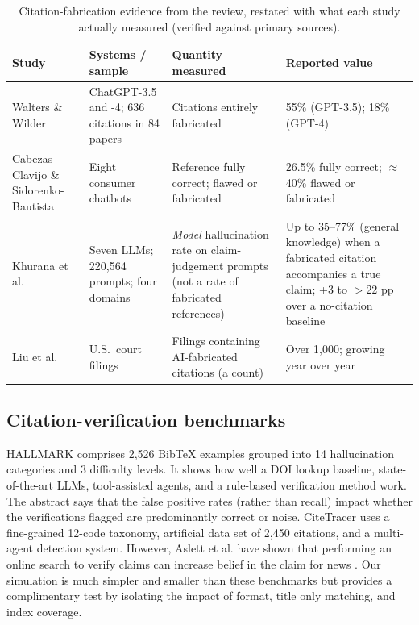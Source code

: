 \begin{table}[t]
\caption{Citation-fabrication evidence from the review, restated with what each study actually measured (verified against primary sources).}
\label{tab:review}
\centering\footnotesize
\begin{tabular}{@{}p{3.1cm}p{4.2cm}p{4.4cm}p{4.8cm}@{}}
\toprule
Study & Systems / sample & Quantity measured & Reported value \\
\midrule
Walters \& Wilder \cite{walters2023} & ChatGPT-3.5 and -4; 636 citations in 84 papers & Citations entirely fabricated & 55\% (GPT-3.5); 18\% (GPT-4) \\
Cabezas-Clavijo \& Sidorenko-Bautista \cite{cabezas2025} & Eight consumer chatbots & Reference fully correct; flawed or fabricated & 26.5\% fully correct; $\approx$40\% flawed or fabricated \\
Khurana et al.\ \cite{khurana2026} & Seven LLMs; 220{,}564 prompts; four domains & \emph{Model} hallucination rate on claim-judgement prompts (not a rate of fabricated references) & Up to 35--77\% (general knowledge) when a fabricated citation accompanies a true claim; +3 to $>$22 pp over a no-citation baseline \\
Liu et al.\ \cite{liu2026} & U.S.\ court filings & Filings containing AI-fabricated citations (a count) & Over 1{,}000; growing year over year \\
\bottomrule
\end{tabular}
\end{table}

\subsection{Citation-verification benchmarks}
HALLMARK \cite{reizinger2026} comprises 2,526 BibTeX examples grouped into 14 hallucination categories and 3 difficulty levels. It
shows how well a DOI lookup baseline, state-of-the-art LLMs, tool-assisted agents, and a rule-based verification method work.
The abstract says that the false positive rates (rather than recall) impact whether the verifications flagged are predominantly correct or
noise. CiteTracer \cite{li2026} uses a fine-grained 12-code taxonomy, artificial data set of 2,450 citations, and a multi-agent detection
system. However, Aslett et al. have shown that performing an online search to verify claims can increase belief in the claim for
news \cite{aslett2024}. Our simulation is much simpler and smaller than these benchmarks but provides a complimentary test by isolating the
impact of format, title only matching, and index coverage.

